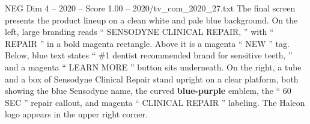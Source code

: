 \begin{textsample}{NEG Dim 4 – 2020 – Score 1.00 – 2020/tv\_com\_2020\_27.txt}
The final screen presents the product lineup on a clean white and pale blue background.
On the left, large branding reads “ SENSODYNE CLINICAL REPAIR, ” with “ REPAIR ” in a bold magenta rectangle.
Above it is a magenta “ NEW ” tag.
Below, blue text states “ \#1 dentist recommended brand for sensitive teeth, ” and a magenta “ LEARN MORE ” button sits underneath.
On the right, a tube and a box of Sensodyne Clinical Repair stand upright on a clear platform, both showing the blue Sensodyne name, the curved \textbf{blue-purple} emblem, the “ 60 SEC ” repair callout, and magenta “ CLINICAL REPAIR ” labeling.
The Haleon logo appears in the upper right corner.

\end{textsample}
